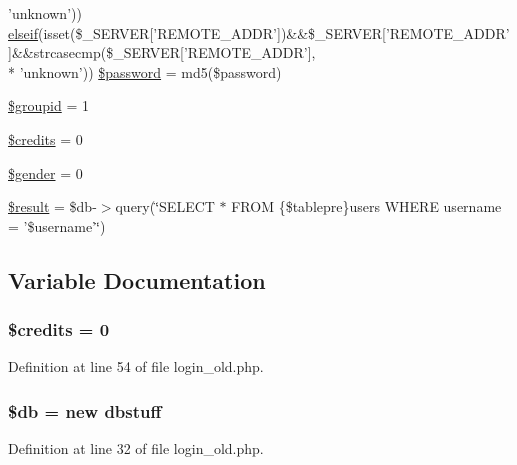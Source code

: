 \begin{DoxyCompactItemize}
'unknown')) \hyperlink{urlist_8php_a77f52b43f81ed05a41b68c2161789055}{elseif}(isset(\$\+\_\+\+S\+E\+R\+V\+E\+R\mbox{[}'R\+E\+M\+O\+T\+E\+\_\+\+A\+D\+D\+R'\mbox{]})\&\&\$\+\_\+\+S\+E\+R\+V\+E\+R\mbox{[}'R\+E\+M\+O\+T\+E\+\_\+\+A\+D\+D\+R'\mbox{]}\&\&strcasecmp(\$\+\_\+\+S\+E\+R\+V\+E\+R\mbox{[}'R\+E\+M\+O\+T\+E\+\_\+\+A\+D\+D\+R'\mbox{]}, \\*
'unknown')) \hyperlink{login__old_8php_a24685489bad7fe10f40dcbead27d5e3e}{\$password} = md5(\$password)
\item 
\hyperlink{login__old_8php_acb3c80fc595983cc4ebdb2d266044fcd}{\$groupid} = 1
\item 
\hyperlink{login__old_8php_a2019a1bb67946f4716cc99e5450c1ab0}{\$credits} = 0
\item 
\hyperlink{login__old_8php_a0f1d7cfb9dc6f494b9014885205fc47e}{\$gender} = 0
\item 
\hyperlink{login__old_8php_a112ef069ddc0454086e3d1e6d8d55d07}{\$result} = \$db-\/$>$query(\char`\"{}S\+E\+L\+E\+C\+T $\ast$ F\+R\+O\+M \{\$tablepre\}users W\+H\+E\+R\+E username = '\$username'\char`\"{})
\end{DoxyCompactItemize}


\subsection{Variable Documentation}
\hypertarget{login__old_8php_a2019a1bb67946f4716cc99e5450c1ab0}{
\subsubsection[{\$credits}]{\setlength{\rightskip}{0pt plus 5cm}\$credits = 0}}\label{login__old_8php_a2019a1bb67946f4716cc99e5450c1ab0}


Definition at line 54 of file login\+\_\+old.\+php.

\hypertarget{login__old_8php_a1fa3127fc82f96b1436d871ef02be319}{
\subsubsection[{\$db}]{\setlength{\rightskip}{0pt plus 5cm}\$db = new {\bf dbstuff}}}\label{login__old_8php_a1fa3127fc82f96b1436d871ef02be319}


Definition at line 32 of file login\+\_\+old.\+php.

